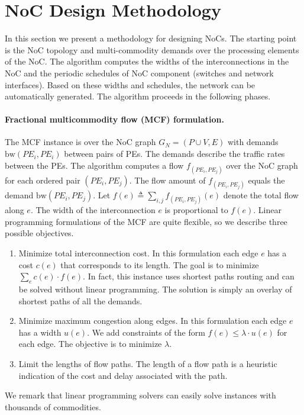 \documentclass[a4paper,12pt]{article}
\newenvironment{proof sketch}[1]{\noindent {\emph{Proof sketch of #1:}}}{\hfill \qed}
\newcommand{\bw}{\textrm{bw}}
\begin{document}
\section{NoC Design Methodology}\label{sec:method}
In this section we present a methodology for designing NoCs. The starting point is
the NoC topology and multi-commodity demands over the processing elements of the NoC.
The algorithm computes the widths of the interconnections in the NoC and  the
periodic schedules of NoC component (switches and network interfaces). Based on these
widths and schedules, the network can be automatically generated. 
The algorithm proceeds in the following phases.

\paragraph{Fractional multicommodity flow (MCF) formulation.}  The MCF instance is over
the NoC graph $G_N=(P\cup V, E)$ with demands $\bw(PE_i,PE_i)$ between pairs of PEs.
The demands describe the traffic rates between the PEs.  The algorithm computes a
flow $f_{(PE_i,PE_j)}$ over the NoC graph for each ordered pair $(PE_i,PE_j)$.  The
flow amount of $f_{(PE_i,PE_j)}$ equals the demand $\bw(PE_i,PE_j)$.  Let
$f(e)\triangleq \sum_{i,j} f_{(PE_i,PE_j)}(e)$ denote the total flow along $e$.  The
width of the interconnection $e$ is proportional to $f(e)$.  Linear programming
formulations of the MCF are quite flexible, so we describe three possible objectives.
\begin{enumerate}
\item Minimize total interconnection cost. In this formulation each edge $e$ has a
  cost $c(e)$ that corresponds to its length. The goal is to minimize $\sum_e
  c(e)\cdot f(e)$.  In fact, this instance uses shortest paths routing and can be
  solved without linear programming. The solution is simply an overlay of shortest
  paths of all the demands.
\item Minimize maximum congestion along edges. In this formulation each edge $e$ has
  a width $u(e)$. We add constraints of the form $f(e)\leq \lambda \cdot u(e)$ for
  each edge. The objective is to minimize $\lambda$.
\item Limit the lengths of flow paths. The length of a flow path is a heuristic
  indication of the cost and delay associated with the path. 
\end{enumerate}
We remark that linear programming solvers can easily solve instances with thousands
of commodities.
\end{document}
